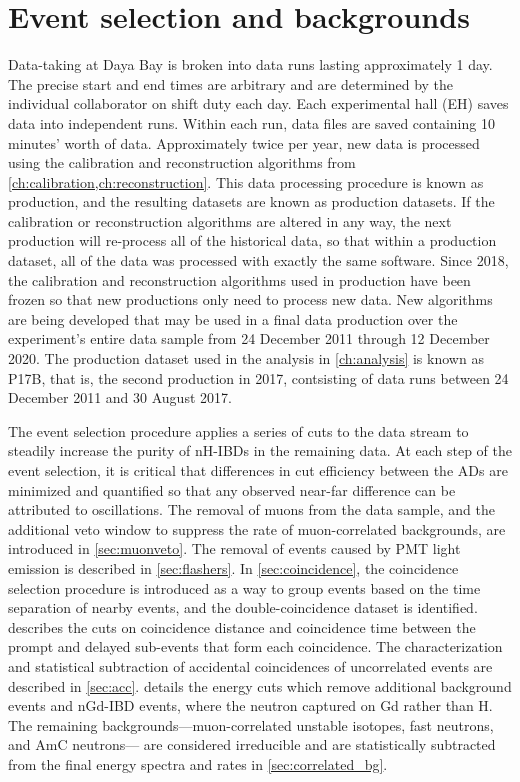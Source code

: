 \chapter{Event selection and backgrounds}
\label{ch:event_selection}

Data-taking at Daya Bay is broken into data runs
lasting approximately 1 day.
The precise start and end times are arbitrary
and are determined by the individual collaborator
on shift duty each day.
Each experimental hall (EH) saves data into independent runs.
Within each run, data files are saved containing 10 minutes' worth of data.
Approximately twice per year, new data is processed
using the calibration and reconstruction algorithms from
\cref{ch:calibration,ch:reconstruction}.
This data processing procedure is known as production, and the resulting datasets
are known as production datasets.
If the calibration or reconstruction algorithms are altered in any way,
the next production will re-process all of the historical data,
so that within a production dataset, all of the data was processed
with exactly the same software.
Since 2018, the calibration and reconstruction algorithms used in production have been
frozen so that new productions only need to process new data.
New algorithms are being developed that may be used
in a final data production over the experiment's entire data sample
from 24 December 2011 through 12 December 2020.
The production dataset used in the \thetaot{} analysis in \cref{ch:analysis} is known as P17B,
that is, the second production in 2017,
contsisting of data runs between 24 December 2011
and 30 August 2017.

The event selection procedure applies a series of cuts to the data stream
to steadily increase the purity of nH-IBDs in the remaining data.
At each step of the event selection, it is critical that
differences in cut efficiency between the ADs are
minimized and quantified so that any observed near-far difference
can be attributed to \nuebar{} oscillations.
The removal of muons from the data sample, and the additional veto window
to suppress the rate of muon-correlated backgrounds,
are introduced in \cref{sec:muonveto}.
The removal of events caused by PMT light emission
is described in \cref{sec:flashers}.
In \cref{sec:coincidence}, the coincidence selection procedure
is introduced as a way to group events based on
the time separation of nearby events,
and the double-coincidence dataset is identified.
 describes the cuts on coincidence distance and coincidence time
between the prompt and delayed sub-events that form each coincidence.
The characterization and statistical subtraction of
accidental coincidences of uncorrelated events
are described in \cref{sec:acc}.
 details the energy cuts
which remove additional background events
and nGd-IBD events, where the neutron captured on Gd rather than H.
The remaining backgrounds---muon-correlated unstable isotopes,
fast neutrons, and AmC neutrons---
are considered irreducible and are statistically subtracted
from the final energy spectra and rates
in \cref{sec:correlated_bg}.

